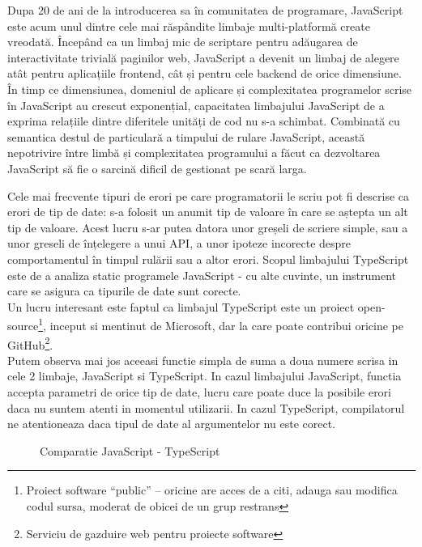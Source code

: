 \documentclass[12pt, a4paper, oneside, romanian]{teza-upb}
\begin{document}
Dupa 20 de ani de la introducerea sa în comunitatea de programare, JavaScript este acum unul dintre cele mai răspândite limbaje multi-platformă create vreodată. Începând ca un limbaj mic de scriptare pentru adăugarea de interactivitate trivială paginilor web, JavaScript a devenit un limbaj de alegere atât pentru aplicațiile frontend, cât și pentru cele backend de orice dimensiune. În timp ce dimensiunea, domeniul de aplicare și complexitatea programelor scrise în JavaScript au crescut exponențial, capacitatea limbajului JavaScript de a exprima relațiile dintre diferitele unități de cod nu s-a schimbat. Combinată cu semantica destul de particulară a timpului de rulare JavaScript, această nepotrivire între limbă și complexitatea programului a făcut ca dezvoltarea JavaScript să fie o sarcină dificil de gestionat pe scară larga.\cite{typescriptlangorgintro}

Cele mai frecvente tipuri de erori pe care programatorii le scriu pot fi descrise ca erori de tip de date: s-a folosit un anumit tip de valoare în care se aștepta un alt tip de valoare. Acest lucru s-ar putea datora unor greșeli de scriere simple, sau a unor greseli de înțelegere a unui API, a unor ipoteze incorecte despre comportamentul în timpul rulării sau a altor erori. Scopul limbajului TypeScript este de a analiza static programele JavaScript - cu alte cuvinte, un instrument care se asigura ca tipurile de date sunt corecte.\cite{typescriptlangorgintro}\\

Un lucru interesant este faptul ca limbajul TypeScript este un proiect open-source\footnote{Proiect software ``public'' -- oricine are acces de a citi, adauga sau modifica codul sursa, moderat de obicei de un grup restrans}, inceput si mentinut de Microsoft, dar la care poate contribui oricine pe GitHub\footnote{Serviciu de gazduire web pentru proiecte software}.\\

Putem observa mai jos aceeasi functie simpla de suma a doua numere scrisa in cele 2 limbaje, JavaScript si TypeScript. In cazul limbajului JavaScript, functia accepta parametri de orice tip de date, lucru care poate duce la posibile erori daca nu suntem atenti in momentul utilizarii. In cazul TypeScript, compilatorul ne atentioneaza daca tipul de date al argumentelor nu este corect.

\begin{figure}[tb]
\centering


\caption{Comparatie JavaScript - TypeScript}
\label{fig:comparatie-javascript-typescript}
\end{figure}
\end{document}
